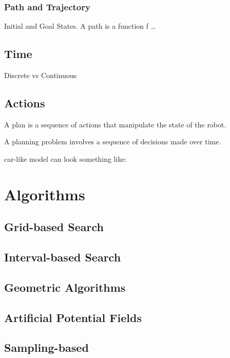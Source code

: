 \subsubsection{Path and Trajectory}

Initial and Goal States. A path is a function f \ldots

\subsection{Time}
\label{subsec:Time}

Discrete vs Continuous

\subsection{Actions}
\label{subsec:Actions}

A plan is a sequence of actions that manipulate the state of the robot.

A planning problem involves a sequence of decisions made over time.


car-like model can look something like:

\section{Algorithms}
\subsection{Grid-based Search}
\label{subsec:gridbasedsearch}

\subsection{Interval-based Search}
\label{subsec:intervalbasedsearch}

\subsection{Geometric Algorithms}
\label{subsec:geometricalgorithms}

\subsection{Artificial Potential Fields}
\label{subsec:artificialpotentialfields}

\subsection{Sampling-based}
\label{subsec:samplingbased}









